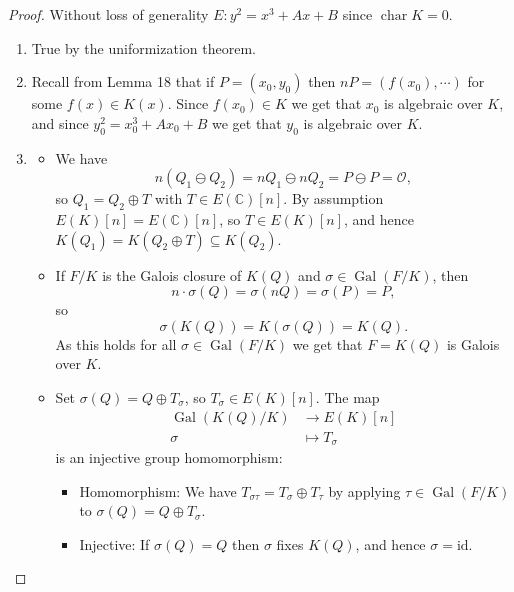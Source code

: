 \documentclass[a4paper]{article}
\theoremstyle{definition}
\DeclareMathOperator{\Gal}{Gal}
\DeclareMathOperator{\ch}{char}
\newcommand{\id}{\mathrm{id}}
\renewcommand{\O}{\mathcal{O}}
\newcommand{\C}{\mathbb{C}}
\begin{document}
\begin{proof}
    Without loss of generality $E:y^2=x^3+Ax+B$ since $\ch K=0$.
    \begin{enumerate}[label=(\roman*)]
        \item True by the uniformization theorem.
        \item Recall from Lemma 18 that if $P=(x_0,y_0)$ then
            $nP=(f(x_0),\cdots)$ for some $f(x)\in K(x)$. Since $f(x_0)\in K$ we
            get that $x_0$ is algebraic over $K$, and since $y_0^2=x_0^3+Ax_0+B$
            we get that $y_0$ is algebraic over $K$.

        \item 
            \begin{itemize}
                \item We have
                    \begin{equation*}
                        n(Q_1\ominus Q_2)=nQ_1\ominus nQ_2=P\ominus P=\O,
                    \end{equation*}
                    so $Q_1=Q_2\oplus T$ with $T\in E(\C)[n]$. By assumption
                    $E(K)[n]=E(\C)[n]$, so $T\in E(K)[n]$, and hence
                    $K(Q_1)=K(Q_2\oplus T)\subseteq K(Q_2)$.

                \item If $F/K$ is the Galois closure of $K(Q)$ and
                    $\sigma\in\Gal(F/K)$, then
                    \begin{equation*}
                        n\cdot\sigma(Q) = \sigma(nQ) = \sigma(P) = P,
                    \end{equation*}
                    so
                    \begin{equation*}
                        \sigma(K(Q)) = K(\sigma(Q)) = K(Q).
                    \end{equation*}
                    As this holds for all $\sigma\in\Gal(F/K)$ we get that
                    $F=K(Q)$ is Galois over $K$.

                \item Set $\sigma(Q)=Q\oplus T_\sigma$, so
                    $T_\sigma\in E(K)[n]$. The map
                    \begin{align*}
                        \Gal(K(Q)/K) &\to E(K)[n] \\
                        \sigma &\mapsto T_\sigma
                    \end{align*}
                    is an injective group homomorphism:
                    \begin{itemize}
                        \item Homomorphism: We have
                            $T_{\sigma\tau}=T_\sigma\oplus T_\tau$ by applying
                            $\tau\in\Gal(F/K)$ to $\sigma(Q)=Q\oplus T_\sigma$.

                        \item Injective: If $\sigma(Q)=Q$ then $\sigma$ fixes
                            $K(Q)$, and hence $\sigma=\id$.
                    \end{itemize}
            \end{itemize}
    \end{enumerate}
\end{proof}
\end{document}
